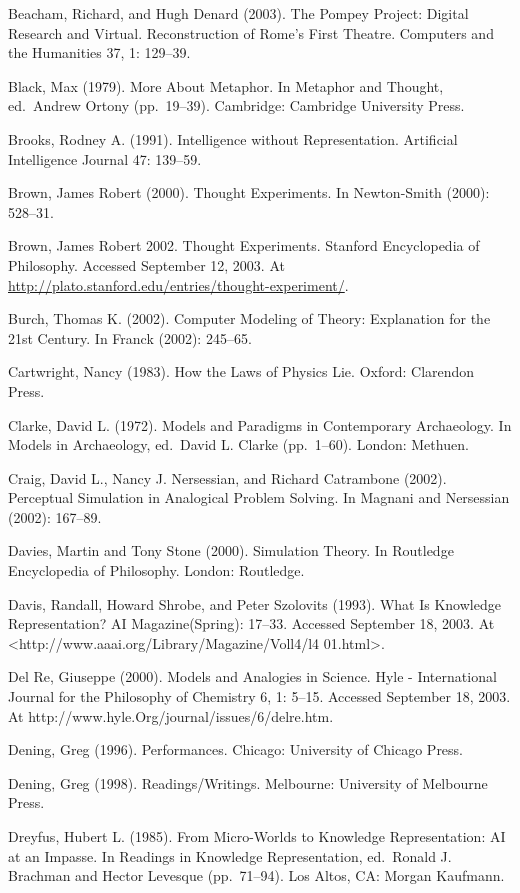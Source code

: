 Beacham, Richard, and Hugh Denard (2003). The Pompey Project: Digital
Research and Virtual. Reconstruction of Rome's First Theatre. Computers
and the Humanities 37, 1: 129--39.

Black, Max (1979). More About Metaphor. In Metaphor and Thought,
ed.~Andrew Ortony (pp.~19--39). Cambridge: Cambridge University Press.

Brooks, Rodney A. (1991). Intelligence without Representation.
Artificial Intelligence Journal 47: 139--59.

Brown, James Robert (2000). Thought Experiments. In Newton-Smith (2000):
528--31.

Brown, James Robert 2002. Thought Experiments. Stanford Encyclopedia of
Philosophy. Accessed September 12, 2003. At
\url{http://plato.stanford.edu/entries/thought-experiment/}.

Burch, Thomas K. (2002). Computer Modeling of Theory: Explanation for
the 21st Century. In Franck (2002): 245--65.

Cartwright, Nancy (1983). How the Laws of Physics Lie. Oxford: Clarendon
Press.

Clarke, David L. (1972). Models and Paradigms in Contemporary
Archaeology. In Models in Archaeology, ed.~David L. Clarke (pp.~1--60).
London: Methuen.

Craig, David L., Nancy J. Nersessian, and Richard Catrambone (2002).
Perceptual Simulation in Analogical Problem Solving. In Magnani and
Nersessian (2002): 167--89.

Davies, Martin and Tony Stone (2000). Simulation Theory. In Routledge
Encyclopedia of Philosophy. London: Routledge.

Davis, Randall, Howard Shrobe, and Peter Szolovits (1993). What Is
Knowledge Representation? AI Magazine(Spring): 17--33. Accessed
September 18, 2003. At
\textless http://www.aaai.org/Library/Magazine/Voll4/l4
01.html\textgreater.

Del Re, Giuseppe (2000). Models and Analogies in Science. Hyle -
International Journal for the Philosophy of Chemistry 6, 1: 5--15.
Accessed September 18, 2003. At
http://www.hyle.Org/journal/issues/6/delre.htm.

Dening, Greg (1996). Performances. Chicago: University of Chicago Press.

Dening, Greg (1998). Readings/Writings. Melbourne: University of
Melbourne Press.

Dreyfus, Hubert L. (1985). From Micro-Worlds to Knowledge
Representation: AI at an Impasse. In Readings in Knowledge
Representation, ed.~Ronald J. Brachman and Hector Levesque (pp.~71--94).
Los Altos, CA: Morgan Kaufmann.

